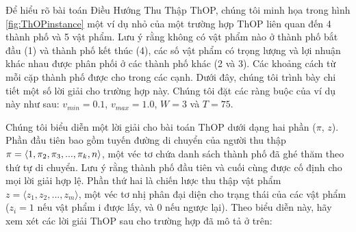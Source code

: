 Để hiểu rõ bài toán Điều Hướng Thu Thập ThOP, chúng tôi minh họa trong hình \ref{fig:ThOPinstance} một ví dụ nhỏ của một trường hợp ThOP liên quan đến 4 thành phố và 5 vật phẩm. Lưu ý rằng không có vật phẩm nào ở thành phố bắt đầu (1) và thành phố kết thúc (4), các số vật phẩm có trọng lượng và lợi nhuận khác nhau được phân phối ở các thành phố khác (2 và 3). Các khoảng cách từ mỗi cặp thành phố được cho trong các cạnh. Dưới đây, chúng tôi trình bày chi tiết một số lời giải cho trường hợp này. Chúng tôi đặt các ràng buộc của ví dụ này như sau: $v_{min} = 0.1$, $v_{max} = 1.0$, $W = 3$ và $T = 75$.

Chúng tôi biểu diễn một lời giải cho bài toán ThOP dưới dạng hai phần ($\pi$, $z$). Phần đầu tiên bao gồm tuyến đường di chuyển của người thu thập $\pi = \langle 1, \pi_2, \pi_3, ..., \\\pi_k, n \rangle$, một véc tơ chứa danh sách thành phố đã ghé thăm theo thứ tự di chuyển. Lưu ý rằng thành phố đầu tiên và cuối cùng được cố định cho mọi lời giải hợp lệ. Phần thứ hai là chiến lược thu thập vật phẩm $z = \langle z_1, z_2, . . . , z_m \rangle$, một véc tơ nhị phân đại diện cho trạng thái của các vật phẩm ($z_i = 1$ nếu vật phẩm i được lấy, và 0 nếu ngược lại). Theo biểu diễn này, hãy xem xét các lời giải ThOP sau cho trường hợp đã mô tả ở trên:
